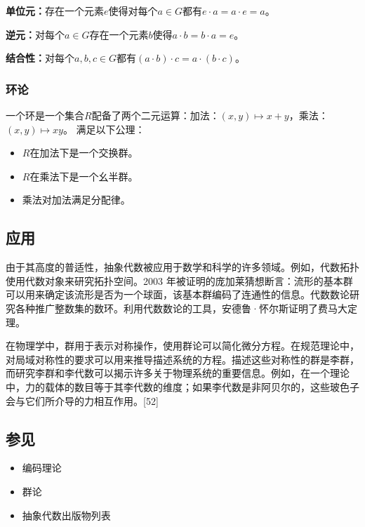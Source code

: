\textbf{单位元：}存在一个元素$e$使得对每个$a \in G$都有$e \cdot a = a \cdot e = a$。  

\textbf{逆元：}对每个$a \in G$存在一个元素$b$使得$a \cdot b = b \cdot a = e$。  

\textbf{结合性：}对每个$a,b,c \in G$都有$(a \cdot b) \cdot c = a \cdot (b \cdot c)$。  
\subsubsection{环论}
一个环是一个集合$R$配备了两个二元运算：加法：$(x,y) \mapsto x + y$，乘法：$(x,y) \mapsto xy$。
满足以下公理：
\begin{itemize}
\item $R$在加法下是一个交换群。  
\item $R$在乘法下是一个幺半群。  
\item 乘法对加法满足分配律。
\end{itemize}
\subsection{应用}
由于其高度的普适性，抽象代数被应用于数学和科学的许多领域。例如，代数拓扑使用代数对象来研究拓扑空间。2003 年被证明的庞加莱猜想断言：流形的基本群可以用来确定该流形是否为一个球面，该基本群编码了连通性的信息。代数数论研究各种推广整数集的数环。利用代数数论的工具，安德鲁·怀尔斯证明了费马大定理。

在物理学中，群用于表示对称操作，使用群论可以简化微分方程。在规范理论中，对局域对称性的要求可以用来推导描述系统的方程。描述这些对称性的群是李群，而研究李群和李代数可以揭示许多关于物理系统的重要信息。例如，在一个理论中，力的载体的数目等于其李代数的维度；如果李代数是非阿贝尔的，这些玻色子会与它们所介导的力相互作用。[52]
\subsection{参见}
\begin{itemize}
\item 编码理论
\item 群论
\item 抽象代数出版物列表
\end{itemize}


